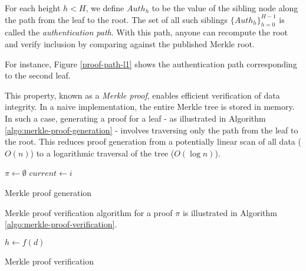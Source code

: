 For each height $h < H$, we define $Auth_h$ to be the value of the sibling node along the path from the leaf to the root. The set of all such siblings $\{Auth_h\}_{h=0}^{H-1}$ is called the \emph{authentication path}. With this path, anyone can recompute the root and verify inclusion by comparing against the published Merkle root.

For instance, Figure \ref{proof-path-l1} shows the authentication path corresponding to the second leaf.

This property, known as a \emph{Merkle proof}, enables efficient verification of data integrity. In a naive implementation, the entire Merkle tree is stored in memory. In such a case, generating a proof for a leaf - as illustrated in Algorithm \ref{algo:merkle-proof-generation} - involves traversing only the path from the leaf to the root. This reduces proof generation from a potentially linear scan of all data ($O(n)$) to a logarithmic traversal of the tree ($O(\log n)$).

\vspace{1em}
\begin{algorithm}[H]
\SetAlgoLined
\DontPrintSemicolon
{}
\BlankLine
$\pi \gets \emptyset$\;
$current \gets i$\;
\Return{$\pi$}\;
\caption{Merkle proof generation}
\label{algo:merkle-proof-generation}
\end{algorithm}

\vspace{1em}

Merkle proof verification algorithm for a proof $\pi$ is illustrated in Algorithm \ref{algo:merkle-proof-verification}.

 \vspace{1em}

\begin{algorithm}[H]
\SetAlgoLined
\DontPrintSemicolon
{}
\BlankLine
$h \gets f(d)$\;
\;
\caption{Merkle proof verification}
\label{algo:merkle-proof-verification}
\end{algorithm}

